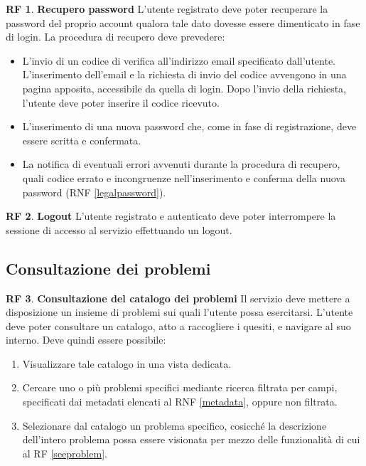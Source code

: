 \documentclass[11pt, a4paper]{article}
\theoremstyle{definition}
\newtheorem{funcreq}{RF} %
\begin{document}
\begin{funcreq}
\label{savepassword}
\textbf{Recupero password }
L'utente registrato deve poter recuperare la password del proprio account
qualora tale dato dovesse essere dimenticato in fase di login. La procedura
di recupero deve prevedere:
\begin{itemize}
    \item L'invio di un codice di verifica all'indirizzo email specificato
    dall'utente. L'inserimento dell'email e la richiesta di invio del
    codice avvengono in una pagina apposita, accessibile da quella di login.
    Dopo l'invio della richiesta, l'utente deve poter inserire il codice
    ricevuto.

    \item L'inserimento di una nuova password che, come in fase di registrazione,
    deve essere scritta e confermata.

    \item La notifica di eventuali errori avvenuti durante la procedura
    di recupero, quali codice errato e incongruenze nell'inserimento
    e conferma della nuova password (RNF \ref{legalpassword}).
\end{itemize}
\end{funcreq}

\begin{funcreq}
\label{logout}
\textbf{Logout }
L'utente registrato e autenticato deve poter interrompere la sessione di
accesso al servizio effettuando un logout.
\end{funcreq}

\subsection{Consultazione dei problemi}

\begin{funcreq}
\label{probcatalogue}
\textbf{Consultazione del catalogo dei problemi }
Il servizio deve mettere a disposizione un insieme di problemi sui quali
l'utente possa esercitarsi. L'utente deve poter consultare un catalogo,
atto a raccogliere i quesiti, e navigare al suo interno. Deve quindi
essere possibile:
\begin{enumerate}
    \item Visualizzare tale catalogo in una vista dedicata.
    
    \item Cercare uno o più problemi specifici mediante ricerca filtrata
    per campi, specificati dai metadati elencati al RNF \ref{metadata},
    oppure non filtrata.

    \item Selezionare dal catalogo un problema specifico, cosicché la
    descrizione dell'intero problema possa essere visionata per mezzo
    delle funzionalità di cui al RF \ref{seeproblem}.
\end{enumerate}
\end{funcreq}
\end{document}
